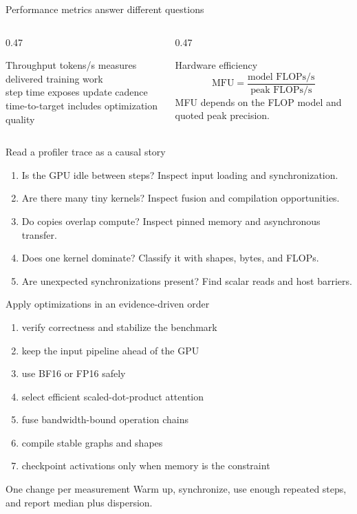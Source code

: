 \documentclass[handout]{beamer}
\begin{document}
\begin{frame}{Performance metrics answer different questions}
  \begin{columns}[t]
    \begin{column}{0.47\linewidth}
      \begin{block}{Throughput}
        tokens/s measures delivered training work\\step time exposes update cadence\\time-to-target includes optimization quality
      \end{block}
    \end{column}
    \begin{column}{0.47\linewidth}
      \begin{block}{Hardware efficiency}
        \[\mathrm{MFU}=\frac{\text{model FLOPs/s}}{\text{peak FLOPs/s}}\]
        MFU depends on the FLOP model and quoted peak precision.
      \end{block}
    \end{column}
  \end{columns}
\end{frame}

\begin{frame}{Read a profiler trace as a causal story}
  \begin{enumerate}
    \setlength{\itemsep}{7pt}
    \item Is the GPU idle between steps? Inspect input loading and synchronization.
    \item Are there many tiny kernels? Inspect fusion and compilation opportunities.
    \item Do copies overlap compute? Inspect pinned memory and asynchronous transfer.
    \item Does one kernel dominate? Classify it with shapes, bytes, and FLOPs.
    \item Are unexpected synchronizations present? Find scalar reads and host barriers.
  \end{enumerate}
\end{frame}

\begin{frame}{Apply optimizations in an evidence-driven order}
  \begin{enumerate}
    \setlength{\itemsep}{5pt}
    \item verify correctness and stabilize the benchmark
    \item keep the input pipeline ahead of the GPU
    \item use BF16 or FP16 safely
    \item select efficient scaled-dot-product attention
    \item fuse bandwidth-bound operation chains
    \item compile stable graphs and shapes
    \item checkpoint activations only when memory is the constraint
  \end{enumerate}
  \begin{alertblock}{One change per measurement}
    Warm up, synchronize, use enough repeated steps, and report median plus dispersion.
  \end{alertblock}
\end{frame}
\end{document}
